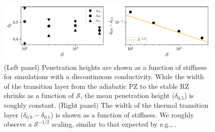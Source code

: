 \documentclass[twocolumn]{aastex631}
\newcommand{\mP}{\ensuremath{\mathcal{P}}}
\newcommand{\mR}{\ensuremath{\mathcal{R}}}
\newcommand{\mS}{\ensuremath{\mathcal{S}}}
\begin{document}

\begin{figure}[t]
\centering
\includegraphics{parameters_vs_s.pdf}
\caption{
(Left panel) Penetration heights are shown as a function of stiffness for simulations with a discontinuous conductivity.
While the width of the transition layer from the adiabatic PZ to the stable RZ shrinks as a function of $\mS$, the mean penetration height ($\delta_{0.5}$) is roughly constant.
(Right panel) The width of the thermal transition layer ($\delta_{0.9} - \delta_{0.1}$) is shown as a function of stiffness.
We roughly observe a $\mS^{-1/2}$ scaling, similar to that expected by e.g., \citet{korre_etal_2019}.
\label{fig:parameters_vs_s}
}
\end{figure}
\end{document}
